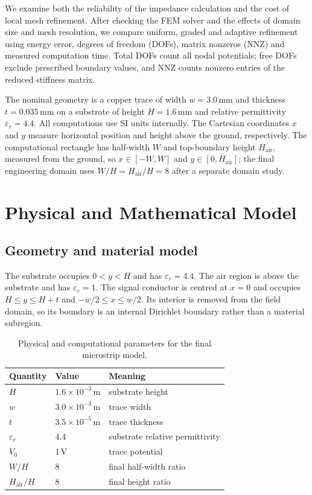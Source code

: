 \documentclass[11pt]{article}
\newcommand{\epsr}{\varepsilon_r}
\begin{document}
We examine both the reliability of the impedance calculation and the cost of local mesh refinement. After checking the FEM solver and the effects of domain size and mesh resolution, we compare uniform, graded and adaptive refinement using energy error, degrees of freedom (DOFs), matrix nonzeros (NNZ) and measured computation time. Total DOFs count all nodal potentials; free DOFs exclude prescribed boundary values, and NNZ counts nonzero entries of the reduced stiffness matrix.

The nominal geometry is a copper trace of width $w=3.0\,\mathrm{mm}$ and thickness $t=0.035\,\mathrm{mm}$ on a substrate of height $H=1.6\,\mathrm{mm}$ and relative permittivity $\epsr=4.4$. All computations use SI units internally. The Cartesian coordinates $x$ and $y$ measure horizontal position and height above the ground, respectively. The computational rectangle has half-width $W$ and top-boundary height $H_{\mathrm{air}}$, measured from the ground, so $x\in[-W,W]$ and $y\in[0,H_{\mathrm{air}}]$; the final engineering domain uses $W/H=H_{\mathrm{air}}/H=8$ after a separate domain study.

\section{Physical and Mathematical Model}
\subsection{Geometry and material model}
The substrate occupies $0<y<H$ and has $\epsr=4.4$. The air region is above the substrate and has $\epsr=1$. The signal conductor is centred at $x=0$ and occupies $H\le y\le H+t$ and $-w/2\le x\le w/2$. Its interior is removed from the field domain, so its boundary is an internal Dirichlet boundary rather than a material subregion.

\begin{table}[H]
\centering
\small
\caption{Physical and computational parameters for the final microstrip model.}
\label{tab:parameters}
\begin{tabular}{@{}lll@{}}
\toprule
Quantity & Value & Meaning\\
\midrule
$H$ & $1.6\times 10^{-3}\,\mathrm{m}$ & substrate height\\
$w$ & $3.0\times 10^{-3}\,\mathrm{m}$ & trace width\\
$t$ & $3.5\times 10^{-5}\,\mathrm{m}$ & trace thickness\\
$\epsr$ & $4.4$ & substrate relative permittivity\\
$V_0$ & $1\,\mathrm{V}$ & trace potential\\
$W/H$ & $8$ & final half-width ratio\\
$H_{\mathrm{air}}/H$ & $8$ & final height ratio\\
\bottomrule
\end{tabular}
\end{table}
\end{document}
